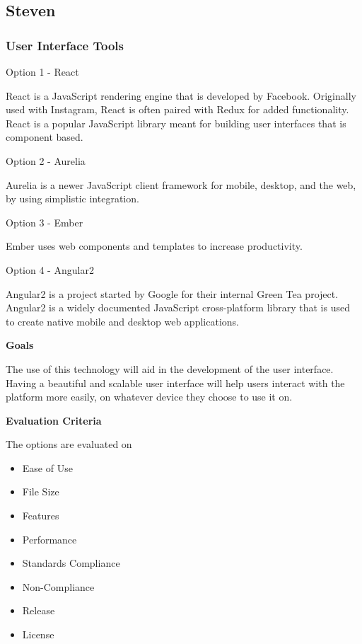 \documentclass[letterpaper, 10pt, draftclsnofoot, compsoc, onecolumn]{IEEEtran}
\begin{document}
\subsection{Steven}
\vspace{1pc}

{\subsubsection{User Interface Tools}
{\noindent Option 1 - React \cite{React} \par}
{\noindent React is a JavaScript rendering engine that is developed by Facebook. Originally used with Instagram, React is often paired with Redux for added functionality. React is a popular JavaScript library meant for building user interfaces that is component based. \par}

\medskip
{\noindent Option 2 - Aurelia \cite{Aurelia} \par}
{\noindent Aurelia is a newer JavaScript client framework for mobile, desktop, and the web, by using simplistic integration.  \par}

\medskip
{\noindent Option 3 - Ember \cite{Ember} \par}
{\noindent Ember uses web components and templates to increase productivity.  \par}

\medskip
{\noindent Option 4 - Angular2 \cite{Angular2} \par}
{\noindent Angular2 is a project started by Google for their internal Green Tea project. Angular2 is a widely documented JavaScript cross-platform library that is used to create native mobile and desktop web applications. \par}

\medskip
{\noindent\rmfamily\bfseries\color{black} Goals \par}
{\noindent The use of this technology will aid in the development of the user interface. Having a beautiful and scalable user interface will help users interact with the platform more easily, on whatever device they choose to use it on. \par}

\medskip
\newpage
{\noindent\rmfamily\bfseries\color{black} Evaluation Criteria \par}
{\noindent The options are evaluated on

\begin{itemize}
\item Ease of Use
\item File Size
\item Features
\item Performance
\item Standards Compliance
\item Non-Compliance
\item Release
\item License
\end{itemize}

}}
\end{document}
